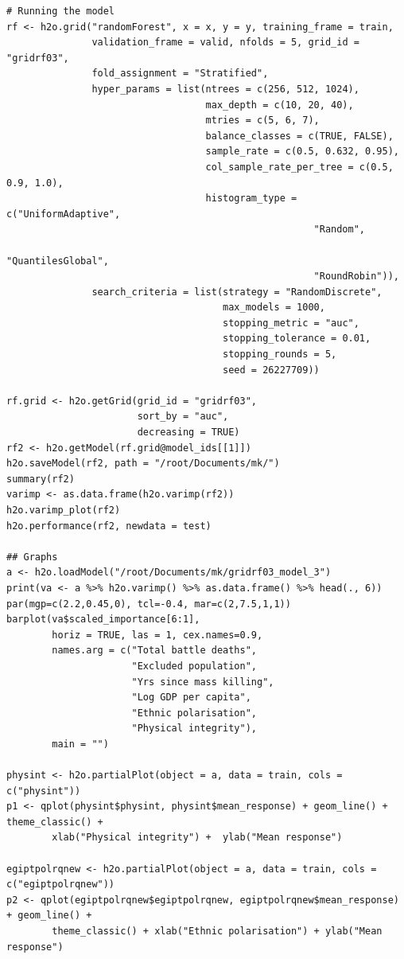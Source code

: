 \documentclass[a4paper,12pt]{article}
\begin{document}
\begin{verbatim}
# Running the model
rf <- h2o.grid("randomForest", x = x, y = y, training_frame = train, 
               validation_frame = valid, nfolds = 5, grid_id = "gridrf03",
               fold_assignment = "Stratified",
               hyper_params = list(ntrees = c(256, 512, 1024),
                                   max_depth = c(10, 20, 40),
                                   mtries = c(5, 6, 7),
                                   balance_classes = c(TRUE, FALSE),
                                   sample_rate = c(0.5, 0.632, 0.95),
                                   col_sample_rate_per_tree = c(0.5, 0.9, 1.0),
                                   histogram_type = c("UniformAdaptive",
                                                      "Random",
                                                      "QuantilesGlobal",
                                                      "RoundRobin")),
               search_criteria = list(strategy = "RandomDiscrete", 
                                      max_models = 1000, 
                                      stopping_metric = "auc", 
                                      stopping_tolerance = 0.01, 
                                      stopping_rounds = 5, 
                                      seed = 26227709)) 

rf.grid <- h2o.getGrid(grid_id = "gridrf03",
                       sort_by = "auc",
                       decreasing = TRUE)
rf2 <- h2o.getModel(rf.grid@model_ids[[1]])
h2o.saveModel(rf2, path = "/root/Documents/mk/")
summary(rf2)
varimp <- as.data.frame(h2o.varimp(rf2))
h2o.varimp_plot(rf2)
h2o.performance(rf2, newdata = test)

## Graphs
a <- h2o.loadModel("/root/Documents/mk/gridrf03_model_3")
print(va <- a %>% h2o.varimp() %>% as.data.frame() %>% head(., 6)) 
par(mgp=c(2.2,0.45,0), tcl=-0.4, mar=c(2,7.5,1,1))
barplot(va$scaled_importance[6:1],
        horiz = TRUE, las = 1, cex.names=0.9,
        names.arg = c("Total battle deaths", 
                      "Excluded population",
                      "Yrs since mass killing",
                      "Log GDP per capita",
                      "Ethnic polarisation",
                      "Physical integrity"),
        main = "")

physint <- h2o.partialPlot(object = a, data = train, cols = c("physint"))
p1 <- qplot(physint$physint, physint$mean_response) + geom_line() + theme_classic() + 
        xlab("Physical integrity") +  ylab("Mean response")

egiptpolrqnew <- h2o.partialPlot(object = a, data = train, cols = c("egiptpolrqnew"))
p2 <- qplot(egiptpolrqnew$egiptpolrqnew, egiptpolrqnew$mean_response) + geom_line() +
        theme_classic() + xlab("Ethnic polarisation") + ylab("Mean response")


\end{verbatim}
\end{document}
